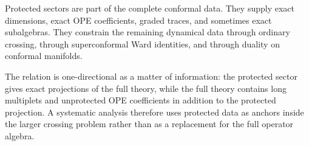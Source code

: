 Protected sectors are part of the complete conformal data.  They supply exact
dimensions, exact OPE coefficients, graded traces, and sometimes exact
subalgebras.  They constrain the remaining dynamical data through ordinary
crossing, through superconformal Ward identities, and through duality on
conformal manifolds.

The relation is one-directional as a matter of information: the protected
sector gives exact projections of the full theory, while the full theory
contains long multiplets and unprotected OPE coefficients in addition to the
protected projection.  A systematic analysis therefore uses protected data as
anchors inside the larger crossing problem rather than as a replacement for
the full operator algebra.
